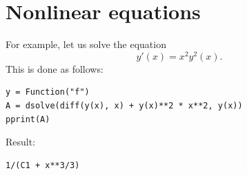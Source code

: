 \documentclass{article}
\begin{document}



\section{Nonlinear equations}

For example, let us solve the equation 
$$
  y'(x) = x^2 y^2(x).
$$
This is done as follows:
\begin{verbatim}
y = Function("f")
A = dsolve(diff(y(x), x) + y(x)**2 * x**2, y(x))
pprint(A)
\end{verbatim}
Result:
\begin{verbatim}
1/(C1 + x**3/3)
\end{verbatim}

\end{document}
